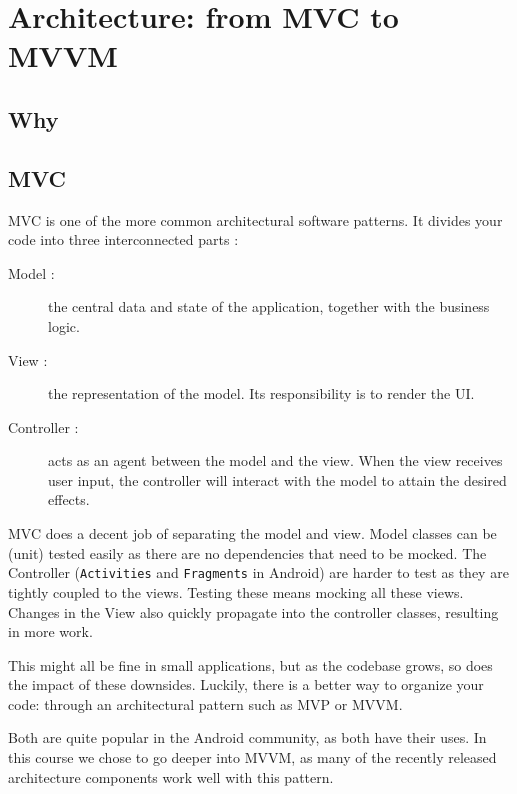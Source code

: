 
\chapter{Architecture: from MVC to MVVM}

\section{Why}

\section{MVC}
MVC is one of the more common architectural software patterns.
It divides your code into three interconnected parts \cite{mvc-mvp-mvv-on-android}: 
\begin{description}
	\item[Model :] the central data and state of the application, together with the business logic.
	\item[View :] the representation of the model. Its responsibility is to render the UI.
	\item[Controller :] acts as an agent between the model and the view. 
		When the view receives user input, the controller will interact with the model to attain the desired effects.
\end{description}

MVC does a decent job of separating the model and view.
Model classes can be (unit) tested easily as there are no dependencies that need to be mocked.
The Controller (\lstinline!Activities! and \lstinline!Fragments! in Android) are harder to test as they are  tightly coupled to the views.
Testing these means mocking all these views. 
Changes in the View also quickly propagate into the controller classes, resulting in more work.

This might all be fine in small applications, but as the codebase grows, so does the impact of these downsides.
Luckily, there is a better way to organize your code: through an architectural pattern such as MVP or MVVM.

Both are quite popular in the Android community, as both have their uses.
In this course we chose to go deeper into MVVM, as many of the recently released architecture components  work well with this pattern.

